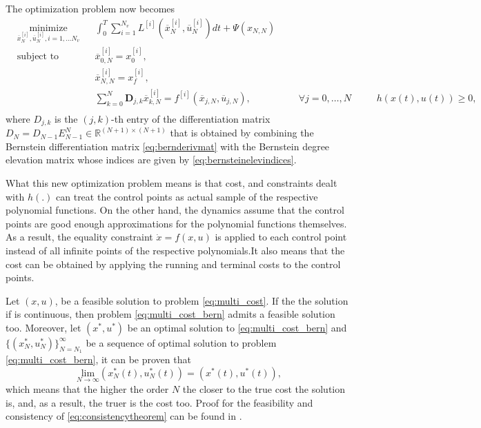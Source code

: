 \par The optimization problem now becomes 
\begin{equation}
    \label{eq:multi_cost_bern}
    \begin{aligned}
    & \underset{\overline{x}_N^{[i]},\overline{u}_N^{[i]},i= 1,\dots N_v}{\text{minimize}} && \int_0^T \sum_{i=1}^{N_v}  L^{[i]} (\overline{x}_N^{[i]},\overline{u}_N^{[i]})dt + \Psi (x_{N,N}) \\
    & \text{subject to}  && \overline{x}^{[i]}_{0,N} = x_0^{[i]}, \\
        & && \overline{x}^{[i]}_{N,N} = x_f^{[i]}, \\
        & && \sum_{k=0}^{N} \boldsymbol{D}_{j,k} \overline{x}_{k,N}^{[i]} = f^{[i]} (\overline{x}_{j,N},\overline{u}_{j,N}), &&& \forall j=0,\dots,N\
        & && h(x(t),u(t)) \geq 0, \\
    \end{aligned}
\end{equation}
where $D_{j,k}$ is the $(j,k)$-th entry of the differentiation matrix $D_N = D_{N-1}E^N_{N-1}\in \mathbb{R}^{(N+1)\times(N+1)}$ that is obtained by combining the Bernstein differentiation matrix \eqref{eq:bernderivmat} with the Bernstein degree elevation matrix whose indices are given by \eqref{eq:bernsteinelevindices}.
\par What this new optimization problem means is that cost, and constraints dealt with $h(.)$ can treat the control points as actual sample of the respective polynomial functions. On the other hand, the dynamics assume that the control points are good enough approximations for the polynomial functions themselves. As a result, the equality constraint $\dot{x}=f(x,u)$ is applied to each control point instead of all infinite points of the respective polynomials.It also means that the cost can be obtained by applying the running and terminal costs to the control points.
\par Let $(x,u)$, be a feasible solution to problem \ref{eq:multi_cost}. If the the solution if is continuous, then problem \ref{eq:multi_cost_bern} admits a feasible solution too. Moreover, let $(x^*,u^*)$ be an optimal solution to \ref{eq:multi_cost_bern} and $\{(x_N^*,u_N^*)\}^\infty_{N=N_1}$ be a sequence of optimal solution to problem \ref{eq:multi_cost_bern}, it can be proven that 
\begin{equation}
    \underset{N\rightarrow\infty}{\text{lim}} (x^*_N(t),u^*_N(t)) = (x^*(t),u^*(t)),
    \label{eq:consistencytheorem}
\end{equation}
which means that the higher the order $N$ the closer to the true cost the solution is, and, as a result, the truer is the cost too. Proof for the feasibility and consistency of \eqref{eq:consistencytheorem} can be found in \cite{cichella2018bernstein}.


